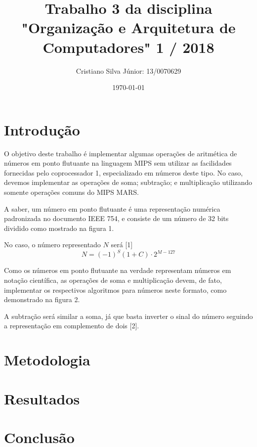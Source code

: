 \documentclass[12pt, a4paper, twoside]{article}
\begin{document}
\title{Trabalho 3 da disciplina "Organização e Arquitetura de Computadores" 1 /
2018}
\author{Cristiano Silva Júnior: 13/0070629}
\date{\today}
\maketitle

\section{Introdução}

O objetivo deste trabalho é implementar algumas operações de aritmética de
números em ponto flutuante na linguagem MIPS sem utilizar as facilidades
fornecidas pelo coprocessador 1, especializado em números deste tipo. No caso,
devemos implementar as operações de soma; subtração; e multiplicação utilizando
somente operações comuns do MIPS MARS.

A saber, um número em ponto flutuante é uma representação numérica padronizada
no documento IEEE 754, e consiste de um número de 32 bits dividido como
mostrado na figura 1.


No caso, o número representado $N$ será [1] $$ N = (-1)^S (1 + C) \cdot 2^{M-127} $$

Como os números em ponto flutuante na verdade representam números em notação
científica, as operações de soma e multiplicação devem, de fato, implementar os
respectivos algoritmos para números neste formato, como demonstrado na figura 2.


A subtração será similar a soma, já que basta inverter o sinal do número
seguindo a representação em complemento de dois [2].

\section{Metodologia}


\section{Resultados}


\section{Conclusão}
\end{document}
